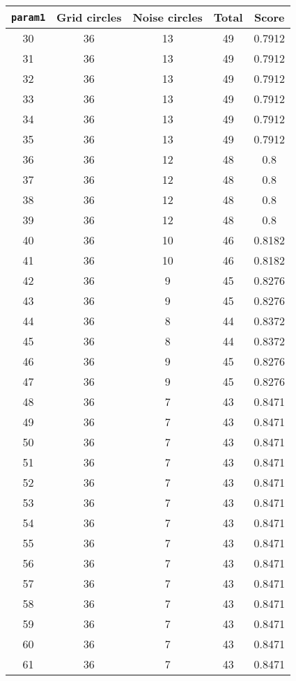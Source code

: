 \documentclass[letterpaper, 12pt]{article}
\begin{document}
\begin{longtable}{|c|c|c|c|c|}
\hline
\textbf{\texttt{param1}} & \textbf{Grid circles} & \textbf{Noise circles} & \textbf{Total} & \textbf{Score} \\
\hline
30 & 36 & 13 & 49 & 0.7912 \\
\hline
31 & 36 & 13 & 49 & 0.7912 \\
\hline
32 & 36 & 13 & 49 & 0.7912 \\
\hline
33 & 36 & 13 & 49 & 0.7912 \\
\hline
34 & 36 & 13 & 49 & 0.7912 \\
\hline
35 & 36 & 13 & 49 & 0.7912 \\
\hline
36 & 36 & 12 & 48 & 0.8 \\
\hline
37 & 36 & 12 & 48 & 0.8 \\
\hline
38 & 36 & 12 & 48 & 0.8 \\
\hline
39 & 36 & 12 & 48 & 0.8 \\
\hline
40 & 36 & 10 & 46 & 0.8182 \\
\hline
41 & 36 & 10 & 46 & 0.8182 \\
\hline
42 & 36 & 9 & 45 & 0.8276 \\
\hline
43 & 36 & 9 & 45 & 0.8276 \\
\hline
44 & 36 & 8 & 44 & 0.8372 \\
\hline
45 & 36 & 8 & 44 & 0.8372 \\
\hline
46 & 36 & 9 & 45 & 0.8276 \\
\hline
47 & 36 & 9 & 45 & 0.8276 \\
\hline
48 & 36 & 7 & 43 & 0.8471 \\
\hline
49 & 36 & 7 & 43 & 0.8471 \\
\hline
50 & 36 & 7 & 43 & 0.8471 \\
\hline
51 & 36 & 7 & 43 & 0.8471 \\
\hline
52 & 36 & 7 & 43 & 0.8471 \\
\hline
53 & 36 & 7 & 43 & 0.8471 \\
\hline
54 & 36 & 7 & 43 & 0.8471 \\
\hline
55 & 36 & 7 & 43 & 0.8471 \\
\hline
56 & 36 & 7 & 43 & 0.8471 \\
\hline
57 & 36 & 7 & 43 & 0.8471 \\
\hline
58 & 36 & 7 & 43 & 0.8471 \\
\hline
59 & 36 & 7 & 43 & 0.8471 \\
\hline
60 & 36 & 7 & 43 & 0.8471 \\
\hline
61 & 36 & 7 & 43 & 0.8471 \\

\end{longtable}
\end{document}
